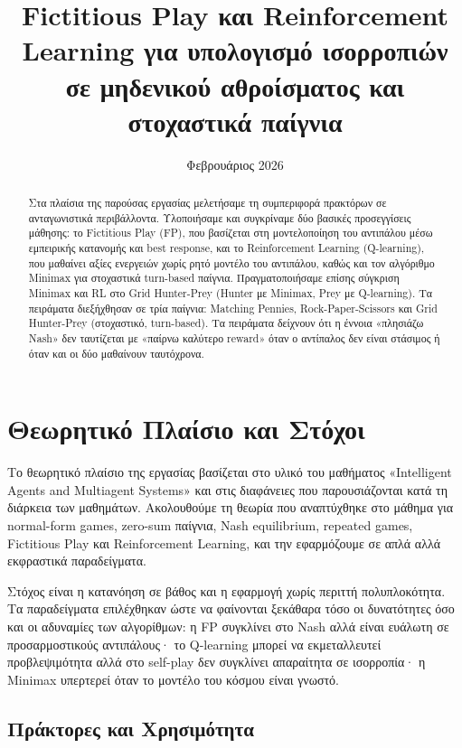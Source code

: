 \documentclass[11pt,a4paper]{article}
\title{Fictitious Play και Reinforcement Learning για υπολογισμό ισορροπιών σε μηδενικού αθροίσματος και στοχαστικά παίγνια}
\author{}
\date{Φεβρουάριος 2026}
\begin{document}
\maketitle

\begin{abstract}
Στα πλαίσια της παρούσας εργασίας μελετήσαμε τη συμπεριφορά πρακτόρων σε ανταγωνιστικά περιβάλλοντα. Υλοποιήσαμε και συγκρίναμε δύο βασικές προσεγγίσεις μάθησης: το Fictitious Play (FP), που βασίζεται στη μοντελοποίηση του αντιπάλου μέσω εμπειρικής κατανομής και best response, και το Reinforcement Learning (Q-learning), που μαθαίνει αξίες ενεργειών χωρίς ρητό μοντέλο του αντιπάλου, καθώς και τον αλγόριθμο Minimax για στοχαστικά turn-based παίγνια. Πραγματοποιήσαμε επίσης σύγκριση Minimax και RL στο Grid Hunter-Prey (Hunter με Minimax, Prey με Q-learning). Τα πειράματα διεξήχθησαν σε τρία παίγνια: Matching Pennies, Rock-Paper-Scissors και Grid Hunter-Prey (στοχαστικό, turn-based). Τα πειράματα δείχνουν ότι η έννοια «πλησιάζω Nash» δεν ταυτίζεται με «παίρνω καλύτερο reward» όταν ο αντίπαλος δεν είναι στάσιμος ή όταν και οι δύο μαθαίνουν ταυτόχρονα.
\end{abstract}

\tableofcontents
\newpage

\section{Θεωρητικό Πλαίσιο και Στόχοι}

Το θεωρητικό πλαίσιο της εργασίας βασίζεται στο υλικό του μαθήματος «Intelligent Agents and Multiagent Systems» και στις διαφάνειες που παρουσιάζονται κατά τη διάρκεια των μαθημάτων. Ακολουθούμε τη θεωρία που αναπτύχθηκε στο μάθημα για normal-form games, zero-sum παίγνια, Nash equilibrium, repeated games, Fictitious Play και Reinforcement Learning, και την εφαρμόζουμε σε απλά αλλά εκφραστικά παραδείγματα.

Στόχος είναι η κατανόηση σε βάθος και η εφαρμογή χωρίς περιττή πολυπλοκότητα. Τα παραδείγματα επιλέχθηκαν ώστε να φαίνονται ξεκάθαρα τόσο οι δυνατότητες όσο και οι αδυναμίες των αλγορίθμων: η FP συγκλίνει στο Nash αλλά είναι ευάλωτη σε προσαρμοστικούς αντιπάλους· το Q-learning μπορεί να εκμεταλλευτεί προβλεψιμότητα αλλά στο self-play δεν συγκλίνει απαραίτητα σε ισορροπία· η Minimax υπερτερεί όταν το μοντέλο του κόσμου είναι γνωστό.

\subsection{Πράκτορες και Χρησιμότητα}
\end{document}
